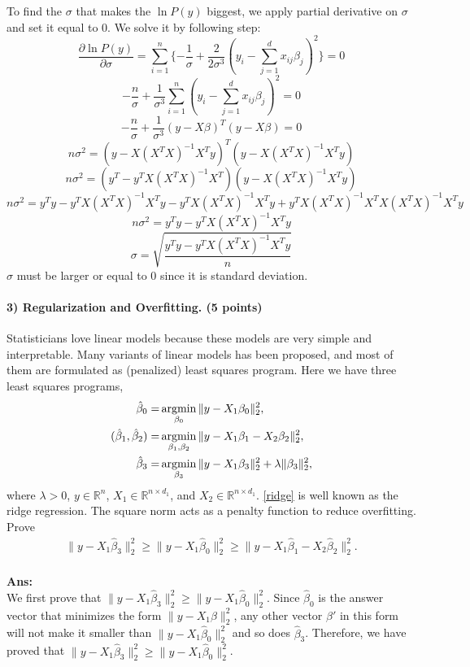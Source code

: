 \documentclass[11pt]{article}
\begin{document}
\noindent
To find the $\sigma$ that makes the $\ln P(y)$ biggest, we apply partial derivative on $\sigma$ and set it equal to 0. We solve it by following step:
%
$$\frac{\partial \ln P(y)}{\partial \sigma} 
= \sum_{i=1}^{n} \{-\frac{1}{\sigma} + \frac{2}{2\sigma^3}(y_i - \sum_{j=1}^{d}x_{ij}\beta_j)^2\}=0$$
%
$$-\frac{n}{\sigma} + \frac{1}{\sigma^3}\sum_{i=1}^{n} (y_i - \sum_{j=1}^{d}x_{ij}\beta_j)^2 = 0$$
%
$$-\frac{n}{\sigma} + \frac{1}{\sigma^3}(y - X\beta)^T(y - X\beta) = 0$$
%
$$n\sigma^2 = (y-X(X^TX)^{-1}X^Ty)^T(y-X(X^TX)^{-1}X^Ty)$$
%
$$n\sigma^2 = (y^T-y^TX(X^TX)^{-1}X^T)(y-X(X^TX)^{-1}X^Ty)$$
%
$$n\sigma^2 = y^Ty - y^TX(X^TX)^{-1}X^Ty - y^TX(X^TX)^{-1}X^Ty + y^TX(X^TX)^{-1}X^TX(X^TX)^{-1}X^Ty$$
%
$$n\sigma^2 = y^Ty - y^TX(X^TX)^{-1}X^Ty$$
%
$$\sigma = \sqrt{\frac{ y^Ty - y^TX(X^TX)^{-1}X^Ty}{n}}$$
$\sigma$ must be larger or equal to 0 since it is standard deviation.

\paragraph{3) Regularization and Overfitting. (5 points)}
Statisticians love linear models because these models are very simple and interpretable. Many variants of linear models has been proposed, and most of them are formulated as (penalized) least squares program. Here we have three least squares programs,
\begin{align}
\hat{\beta}_0 = &\mathop{\rm argmin}_{\beta_0}  \|y-X_1\beta_0\|_2^2, \label{partial}\\
(\hat{\beta}_1,\hat{\beta}_2) = &\mathop{\rm argmin}_{\beta_1,\beta_2}  \|y-X_1\beta_1-X_2\beta_2\|_2^2, \label{complete}\\
\hat{\beta}_3 = &\mathop{\rm argmin}_{\beta_3} \|y-X_1\beta_3\|_2^2 +\lambda\|\beta_3\|_2^2 \label{ridge},
\end{align}
where $\lambda>0$, $y\in\mathbb{R}^n$, $X_1\in\mathbb{R}^{n \times d_1}$, and $X_2\in\mathbb{R}^{n \times d_1}$. \eqref{ridge} is well known as the ridge regression. The square norm acts as a penalty function to reduce overfitting. Prove
\begin{align}\label{overfitting}
\|y-X_1\hat{\beta}_3\|_2^2 \geq \|y-X_1\hat{\beta}_0\|_2^2 \geq \|y-X_1\hat{\beta}_1-X_2\hat{\beta}_2\|_2^2.
\end{align}
\text{}\\
\textbf{Ans:}\\
We first prove that $\|y-X_1\hat{\beta}_3\|_2^2 \geq \|y-X_1\hat{\beta}_0\|_2^2$. Since $\hat{\beta}_0$ is the answer vector that minimizes the form $\|y-X_1\beta\|_2^2$, any other vector $\beta'$ in this form will not make it smaller than $\|y-X_1\hat{\beta}_0\|_2^2$ and so does $\hat{\beta}_3$. Therefore, we have proved that $\|y-X_1\hat{\beta}_3\|_2^2 \geq \|y-X_1\hat{\beta}_0\|_2^2$.\\ 
\end{document}
